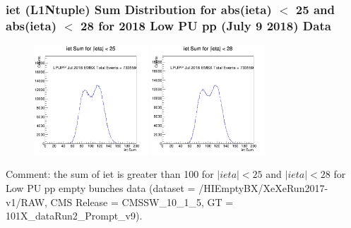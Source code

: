 \documentclass{beamer}
\begin{document}
\begin{frame}
\frametitle{iet (L1Ntuple) Sum Distribution for abs(ieta) $<$ 25 and abs(ieta) $<$ 28 for 2018 Low PU pp (July 9 2018) Data} 

\begin{figure}
\includegraphics[width=0.38\textwidth]{Plots/pp/iETSumHisLT25.png}
\includegraphics[width=0.38\textwidth]{Plots/pp/iETSumHisLT28.png}
\end{figure}


\begin{block}
{Comment: the sum of iet is greater than 100 for $|ieta| < 25$ and $|ieta| < 28$ for Low PU pp empty bunches data (dataset = /HIEmptyBX/XeXeRun2017-v1/RAW, CMS Release = CMSSW\_10\_1\_5, GT = 101X\_dataRun2\_Prompt\_v9).}
\end{block}
\end{frame}
\end{document}
